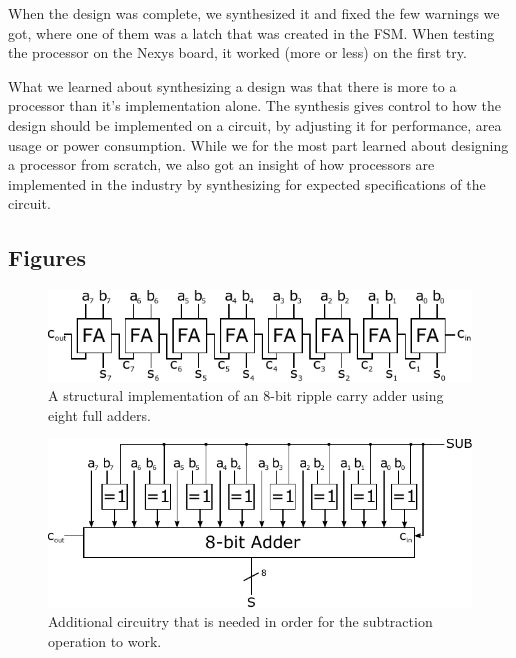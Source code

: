 \documentclass[a4,11pt]{article}
\begin{document}
When the design was complete, we synthesized it and fixed the few warnings we
got, where one of them was a latch that was created in the FSM. When testing
the processor on the Nexys board, it worked (more or less) on the first try.

What we learned about synthesizing a design was that there is more to a
processor than it's implementation alone. The synthesis gives control to how
the design should be implemented on a circuit, by adjusting it for performance,
area usage or power consumption. While we for the most part learned about
designing a processor from scratch, we also got an insight of how processors
are implemented in the industry by synthesizing for expected specifications of
the circuit.

\newpage
\begin{appendix}

\section{Figures}
\label{app:fig}

\begin{figure}[h!]
 	\centering
	\includegraphics[width=1\columnwidth]{Figurer/rca}
  	\caption{A structural implementation of an 8-bit ripple carry adder using eight full adders.}
  	\label{fig:rca}
\end{figure}

\begin{figure}[h!]
 	\centering
	\includegraphics[width=1\columnwidth]{Figurer/sub}
  	\caption{Additional circuitry that is needed in order for the subtraction
		operation to work.}
  	\label{fig:sub}
\end{figure}

\end{appendix}
\end{document}
